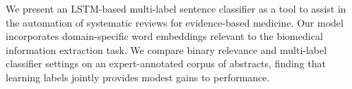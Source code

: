 We present an LSTM-based multi-label sentence classifier as a tool to assist in the automation of systematic reviews for evidence-based medicine. Our model incorporates domain-specific word embeddings relevant to the biomedical information extraction task. We compare binary relevance and multi-label classifier settings on an expert-annotated corpus of abstracts, finding that learning labels jointly provides modest gains to performance.
